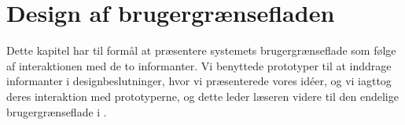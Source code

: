 \chapter{Design af brugergrænsefladen}
\label{chap:designafbrugergraenseflade}

Dette kapitel har til formål at præsentere systemets brugergrænseflade som følge af interaktionen med de to informanter. Vi benyttede prototyper til at inddrage informanter i designbeslutninger, hvor vi præsenterede vores idéer, og vi iagttog deres interaktion med prototyperne, og dette leder læseren videre til den endelige brugergrænseflade i .



